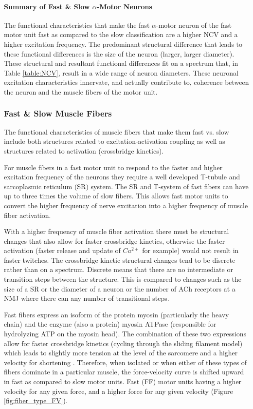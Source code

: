 \paragraph{Summary of Fast \& Slow $\alpha$-Motor Neurons}
The functional characteristics that make the fast $\alpha$-motor neuron of the fast motor unit fast as compared to the slow classification are a higher NCV and a higher excitation frequency. The predominant structural difference that leads to these functional differences is the size of the neuron (larger, larger diameter). These structural and resultant functional differences fit on a spectrum that, in Table \ref{table:NCV}, result in a wide range of neuron diameters. These neuronal excitation characteristics innervate, and actually contribute to, coherence between the neuron and the muscle fibers of the motor unit.


\subsubsection{Fast \& Slow Muscle Fibers}

The functional characteristics of muscle fibers that make them fast vs. slow include both structures related to excitation-activation coupling as well as structures related to activation (crossbridge kinetics). 

For muscle fibers in a fast motor unit to respond to the faster and higher excitation frequency of the neurons they require a well developed T-tubule and sarcoplasmic reticulum (SR) system. The SR and T-system of fast fibers can have up to three times the volume of slow fibers. This allows fast motor units to convert the higher frequency of nerve excitation into a higher frequency of muscle fiber activation.

With a higher frequency of muscle fiber activation there must be structural changes that also allow for faster crossbridge kinetics, otherwise the faster activation (faster release and update of $Ca^{2+}$ for example) would not result in faster twitches. The crossbridge kinetic structural changes tend to be discrete rather than on a spectrum. Discrete means that there are no intermediate or transition steps between the structure. This is compared to changes such as the size of a SR or the diameter of a neuron or the number of ACh receptors at a NMJ where there can any number of transitional steps. 

Fast fibers express an isoform of the protein myosin (particularly the heavy chain) and the enzyme (also a protein) myosin ATPase (responsible for hydrolyzing ATP on the myosin head). The combination of these two expressions allow for faster crossbridge kinetics (cycling through the sliding filament model) which leads to slightly more tension at the level of the sarcomere and a higher velocity for shortening \cite{larsson_maximum_1993, schiaffino_molecular_1996}. Therefore, when isolated or when either of these types of fibers dominate in a particular muscle, the force-velocity curve is shifted upward in fast as compared to slow motor units. Fast (FF) motor units having a higher velocity for any given force, and a higher force for any given velocity (Figure \ref{fig:fiber_type_FV}). 


